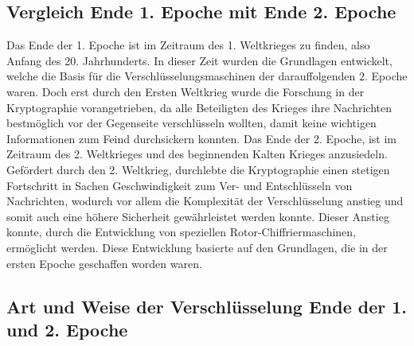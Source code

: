 \subsection{Vergleich Ende 1. Epoche mit Ende 2. Epoche}
Das Ende der 1. Epoche ist im Zeitraum des 1. Weltkrieges zu finden, also Anfang des 20. Jahrhunderts. In dieser Zeit wurden die Grundlagen entwickelt, welche die Basis für die Verschlüsselungsmaschinen der darauffolgenden 2. Epoche waren. Doch erst durch den Ersten Weltkrieg wurde die Forschung in der Kryptographie vorangetrieben, da alle Beteiligten des Krieges ihre Nachrichten bestmöglich vor der Gegenseite verschlüsseln wollten, damit keine wichtigen Informationen zum Feind durchsickern konnten. Das Ende der 2. Epoche, ist im Zeitraum des 2. Weltkrieges und des beginnenden Kalten Krieges anzusiedeln. Gefördert durch den 2. Weltkrieg, durchlebte die Kryptographie einen stetigen Fortschritt in Sachen Geschwindigkeit zum Ver- und Entschlüsseln von Nachrichten, wodurch vor allem die Komplexität der Verschlüsselung anstieg und somit auch eine höhere Sicherheit gewährleistet werden konnte. Dieser Anstieg konnte, durch die Entwicklung von speziellen Rotor-Chiffriermaschinen, ermöglicht werden. Diese Entwicklung basierte auf den Grundlagen, die in der ersten Epoche geschaffen worden waren. 

\subsection{Art und Weise der Verschlüsselung Ende der 1. und 2. Epoche}

